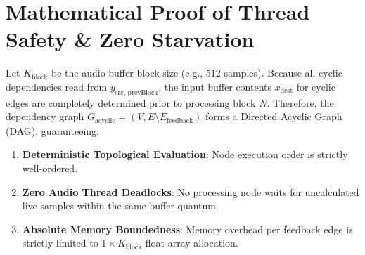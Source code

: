 \documentclass[11pt,a4paper]{article}
\begin{document}
\section{Mathematical Proof of Thread Safety \& Zero Starvation}
Let $K_{\text{block}}$ be the audio buffer block size (e.g., 512 samples).
Because all cyclic dependencies read from $y_{\text{src, prevBlock}}$, the input buffer contents $x_{\text{dest}}$ for cyclic edges are completely determined prior to processing block $N$.
Therefore, the dependency graph $G_{\text{acyclic}} = (V, E \setminus E_{\text{feedback}})$ forms a Directed Acyclic Graph (DAG), guaranteeing:
\begin{enumerate}
\item \textbf{Deterministic Topological Evaluation}: Node execution order is strictly well-ordered.
\item \textbf{Zero Audio Thread Deadlocks}: No processing node waits for uncalculated live samples within the same buffer quantum.
\item \textbf{Absolute Memory Boundedness}: Memory overhead per feedback edge is strictly limited to $1 \times K_{\text{block}}$ float array allocation.
\end{enumerate}
\end{document}
